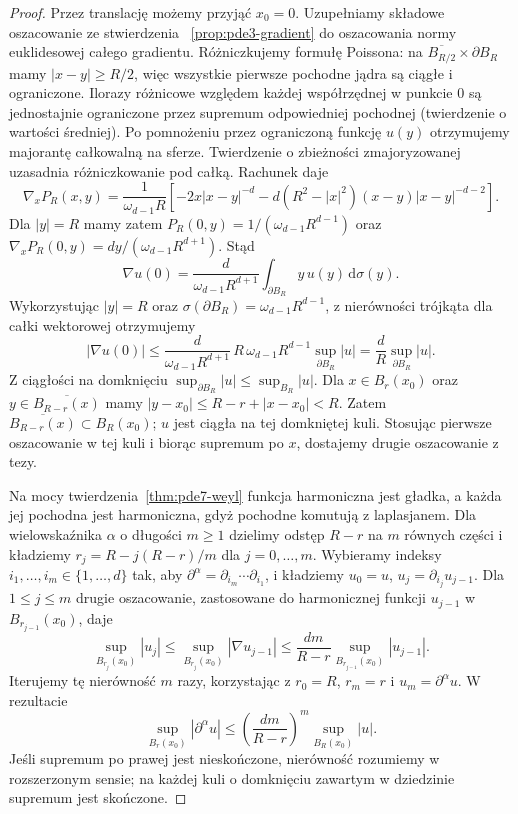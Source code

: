 \begin{proof}
Przez translację możemy przyjąć $x_0=0$.
Uzupełniamy składowe oszacowanie ze stwierdzenia
~\ref{prop:pde3-gradient} do oszacowania normy euklidesowej
całego gradientu. Różniczkujemy formułę Poissona:
na $\overline{B_{R/2}}\times\partial B_R$ mamy $|x-y|\ge R/2$,
więc wszystkie pierwsze pochodne jądra są ciągłe
i ograniczone. Ilorazy różnicowe względem każdej współrzędnej
w punkcie $0$ są jednostajnie ograniczone przez supremum
odpowiedniej pochodnej (twierdzenie o wartości średniej).
Po pomnożeniu przez ograniczoną funkcję $u(y)$ otrzymujemy
majorantę całkowalną na sferze. Twierdzenie o zbieżności
zmajoryzowanej uzasadnia różniczkowanie pod całką.
Rachunek daje
\[
 \nabla_x P_R(x,y)=\frac{1}{\omega_{d-1}R}
 \left[-2x|x-y|^{-d}
 -d(R^2-|x|^2)(x-y)|x-y|^{-d-2}\right].
\]
Dla $|y|=R$ mamy zatem
$P_R(0,y)=1/(\omega_{d-1}R^{d-1})$ oraz
$\nabla_x P_R(0,y)=d y/(\omega_{d-1}R^{d+1})$. Stąd
\[
 \nabla u(0)=\frac{d}{\omega_{d-1}R^{d+1}}
 \int_{\partial B_R}y\,u(y)\,\mathrm d\sigma(y).
\]
Wykorzystując $|y|=R$ oraz
$\sigma(\partial B_R)=\omega_{d-1}R^{d-1}$,
z nierówności trójkąta dla całki wektorowej otrzymujemy
\[
 |\nabla u(0)|\le
 \frac{d}{\omega_{d-1}R^{d+1}}\,
 R\,\omega_{d-1}R^{d-1}\sup_{\partial B_R}|u|
 =\frac dR\sup_{\partial B_R}|u|.
\]
Z ciągłości na domknięciu $\sup_{\partial B_R}|u|
\le\sup_{B_R}|u|$. Dla $x\in B_r(x_0)$ oraz
$y\in\overline{B_{R-r}(x)}$ mamy
$|y-x_0|\le R-r+|x-x_0|<R$.
Zatem $\overline{B_{R-r}(x)}\subset B_R(x_0)$;
$u$ jest ciągła na tej domkniętej kuli.
Stosując pierwsze oszacowanie w tej kuli i biorąc
supremum po $x$, dostajemy drugie oszacowanie z tezy.

Na mocy twierdzenia~\ref{thm:pde7-weyl} funkcja harmoniczna
jest gładka, a każda jej pochodna jest harmoniczna, gdyż
pochodne komutują z laplasjanem. Dla wielowskaźnika
$\alpha$ o długości $m\ge1$ dzielimy odstęp $R-r$
na $m$ równych części i kładziemy
$r_j=R-j(R-r)/m$ dla $j=0,\ldots,m$.
Wybieramy indeksy $i_1,\ldots,i_m\in\{1,\ldots,d\}$
tak, aby $\partial^\alpha=\partial_{i_m}\cdots\partial_{i_1}$,
i kładziemy $u_0=u$, $u_j=\partial_{i_j}u_{j-1}$.
Dla $1\le j\le m$ drugie oszacowanie, zastosowane
do harmonicznej funkcji $u_{j-1}$ w $B_{r_{j-1}}(x_0)$,
daje
\[
 \sup_{B_{r_j}(x_0)}|u_j|
 \le \sup_{B_{r_j}(x_0)}|\nabla u_{j-1}|
 \le \frac{dm}{R-r}\sup_{B_{r_{j-1}}(x_0)}|u_{j-1}|.
\]
Iterujemy tę nierówność $m$ razy, korzystając z $r_0=R$,
$r_m=r$ i $u_m=\partial^\alpha u$. W rezultacie
\[
 \sup_{B_r(x_0)}|\partial^\alpha u|
 \le \left(\frac{dm}{R-r}\right)^m\sup_{B_R(x_0)}|u|.
\]
Jeśli supremum po prawej jest nieskończone, nierówność
rozumiemy w rozszerzonym sensie; na każdej kuli o domknięciu
zawartym w dziedzinie supremum jest skończone.
\end{proof}

